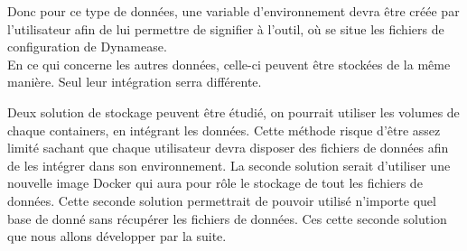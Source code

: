 Donc pour ce type de données, une variable d'environnement devra être créée par l'utilisateur afin de lui permettre de signifier à l'outil, où se situe les fichiers de configuration de Dynamease.\\

En ce qui concerne les autres données, celle-ci peuvent être stockées de la même manière. Seul leur intégration serra différente.

Deux solution de stockage peuvent être étudié, on pourrait utiliser les volumes de chaque containers, en intégrant les données. Cette méthode risque d'être assez limité sachant que chaque utilisateur devra disposer des fichiers de données afin de les intégrer dans son environnement. La seconde solution serait d'utiliser une nouvelle image Docker qui aura pour rôle le stockage de tout les fichiers de données. Cette seconde solution permettrait de pouvoir utilisé n'importe quel base de donné sans récupérer les fichiers de données. Ces cette seconde solution que nous allons développer par la suite.

